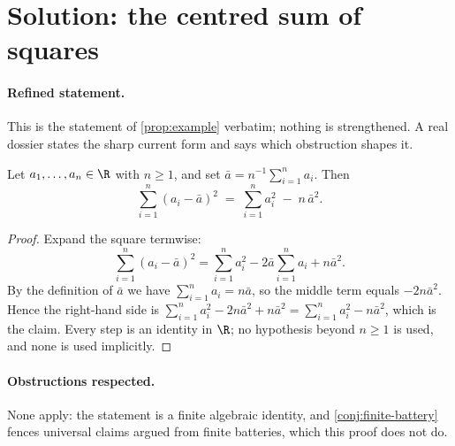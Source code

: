 \documentclass[../../main.tex]{subfiles}
\begin{document}

\section*{Solution: the centred sum of squares}
\label{sec:sol-prop-example}

\paragraph{Refined statement.}
This is the statement of \ref{prop:example} verbatim; nothing is strengthened. A
real dossier states the sharp current form and says which obstruction shapes it.

\begin{theorem}
\label{thm:sol-prop-example}
  Let $a_1,\dots,a_n \in \R$ with $n \ge 1$, and set $\bar a = n^{-1}\sum_{i=1}^n a_i$.
  Then
  \[
    \sum_{i=1}^n (a_i - \bar a)^2 \;=\; \sum_{i=1}^n a_i^2 \;-\; n\,\bar a^2 .
  \]
\end{theorem}

\begin{proof}
  Expand the square termwise:
  \[
    \sum_{i=1}^n (a_i - \bar a)^2
      = \sum_{i=1}^n a_i^2 - 2\bar a \sum_{i=1}^n a_i + n \bar a^2 .
  \]
  By the definition of $\bar a$ we have $\sum_{i=1}^n a_i = n \bar a$, so the
  middle term equals $-2 n \bar a^2$. Hence the right-hand side is
  $\sum_{i=1}^n a_i^2 - 2n\bar a^2 + n\bar a^2 = \sum_{i=1}^n a_i^2 - n\bar a^2$,
  which is the claim. Every step is an identity in $\R$; no hypothesis beyond
  $n \ge 1$ is used, and none is used implicitly.
\end{proof}

\paragraph{Obstructions respected.}
None apply: the statement is a finite algebraic identity, and \ref{conj:finite-battery}
fences universal claims argued from finite batteries, which this proof does not do.

\end{document}
